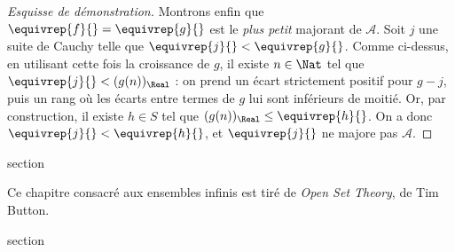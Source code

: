 \documentclass[11pt,a4paper,openany]{memoir}
\begin{document}
\begin{proof}[Esquisse de démonstration]
Montrons enfin que $\equivrep{f}{}=\equivrep{g}{}$ est le
\emph{plus petit} majorant de $\mathcal A$. Soit $j$ une suite de
Cauchy telle que $\equivrep{j}{}<\equivrep{g}{}$.
Comme ci-dessus, en utilisant cette fois la croissance de $g$,
il existe $n\in\Nat$ tel que $\equivrep{j}{}<(g(n))_\Real$ :
on prend un écart strictement positif pour $g-j$, puis un rang
où les écarts entre termes de $g$ lui sont inférieurs de moitié.
Or, par construction, il existe $h\in S$ tel que
$(g(n))_\Real\leq\equivrep{h}{}$. On a donc
$\equivrep{j}{}<\equivrep{h}{}$, et $\equivrep{j}{}$ ne majore pas
$\mathcal A$.
\end{proof}


\endgroup


\OLEndChapterHook


\endgroup


\begingroup
\expandafter\def\csname ol@sectioncs\endcsname{section}
\def\olfilename{infinite}



\begin{editorial}
Ce chapitre consacré aux ensembles infinis est tiré de
\emph{Open Set Theory}, de Tim Button.
\end{editorial}


\begingroup
\expandafter\def\csname ol@sectioncs\endcsname{section}
\def\olfilename{hilberts-hotel}


\end{document}

